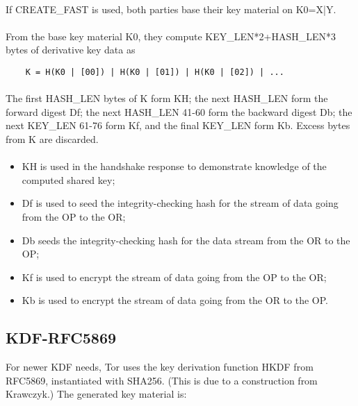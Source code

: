 \paragraph{}
If CREATE\_FAST is used, both parties base their key material on
K0=X|Y.

\paragraph{}
From the base key material K0, they compute KEY\_LEN*2+HASH\_LEN*3 bytes of
derivative key data as
\begin{verbatim}
    K = H(K0 | [00]) | H(K0 | [01]) | H(K0 | [02]) | ...
\end{verbatim}

\paragraph{}

The first HASH\_LEN bytes of K form KH; the next HASH\_LEN form the forward
digest Df; the next HASH\_LEN 41-60 form the backward digest Db; the next
KEY\_LEN 61-76 form Kf, and the final KEY\_LEN form Kb. Excess bytes from K
are discarded.

\paragraph{}
\begin{itemize}
    \item KH is used in the handshake response to demonstrate knowledge of the
    computed shared key;
    \item Df is used to seed the integrity-checking hash
    for the stream of data going from the OP to the OR;
    \item Db seeds the integrity-checking hash for the data stream from the OR to the OP;
    \item Kf is used to encrypt the stream of data going from the OP to the OR;
    \item Kb is used to encrypt the stream of data going from the OR to the OP.
\end{itemize}

\subsection{KDF-RFC5869}
For newer KDF needs, Tor uses the key derivation function HKDF from
RFC5869, instantiated with SHA256. (This is due to a construction
from Krawczyk.) The generated key material is:

